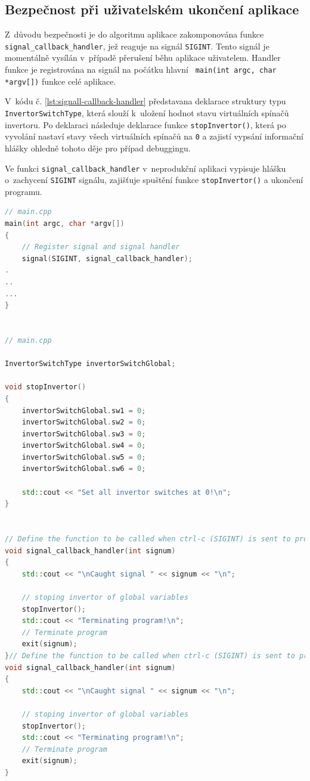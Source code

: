 \documentclass[a4paper, twoside, 11pt]{article}
\begin{document}
	\subsection{Bezpečnost při uživatelském ukončení aplikace}
	Z~důvodu bezpečnosti je do algoritmu aplikace zakomponována funkce \texttt{signal\_callback\_handler}, jež reaguje na signál \texttt{SIGINT}. Tento signál je momentálně vysílán v~případě přerušení běhu aplikace uživatelem. Handler funkce je registrována na signál na počátku hlavní \texttt{ main(int argc, char *argv[])} funkce celé aplikace.\par
	V~kódu č. \ref{lst:signall-callback-handler} představana deklarace struktury typu \texttt{InvertorSwitchType}, která slouží k~uložení hodnot stavu virtuálních spínačů invertoru. Po deklaraci následuje deklarace funkce \texttt{stopInvertor()}, která po vyvolání nastaví stavy všech virtuálních spínačů na \texttt{0} a zajistí vypsání informační hlášky ohledně tohoto děje pro případ debuggingu.\par
	Ve funkci \texttt{signal\_callback\_handler} v~neprodukční aplikaci vypisuje hlášku o~zachycení \texttt{SIGINT} signálu, zajišťuje spuštění funkce \texttt{stopInvertor()} a ukončení programu.

	\begin{lstlisting}[language={c++}, caption={signal\_callback\_handler funkce a její registrace na signál SIGINT}, label={lst:signall-callback-handler}]
// main.cpp
main(int argc, char *argv[])
{
	// Register signal and signal handler
	signal(SIGINT, signal_callback_handler);
.
..
...
}


// main.cpp

InvertorSwitchType invertorSwitchGlobal;

void stopInvertor()
{
    invertorSwitchGlobal.sw1 = 0;
    invertorSwitchGlobal.sw2 = 0;
    invertorSwitchGlobal.sw3 = 0;
    invertorSwitchGlobal.sw4 = 0;
    invertorSwitchGlobal.sw5 = 0;
    invertorSwitchGlobal.sw6 = 0;

    std::cout << "Set all invertor switches at 0!\n";
}


// Define the function to be called when ctrl-c (SIGINT) is sent to process
void signal_callback_handler(int signum)
{
    std::cout << "\nCaught signal " << signum << "\n";

    // stoping invertor of global variables
    stopInvertor();
    std::cout << "Terminating program!\n";
    // Terminate program
    exit(signum);
}// Define the function to be called when ctrl-c (SIGINT) is sent to process
void signal_callback_handler(int signum)
{
    std::cout << "\nCaught signal " << signum << "\n";

    // stoping invertor of global variables
    stopInvertor();
    std::cout << "Terminating program!\n";
    // Terminate program
    exit(signum);
}\end{lstlisting}
\end{document}
